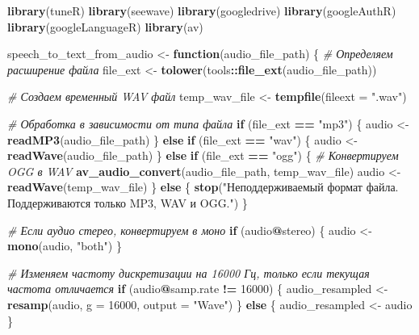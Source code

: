 \documentclass[
]{book}
\newenvironment{Shaded}{\begin{snugshade}}{\end{snugshade}}
\newcommand{\AttributeTok}[1]{\textcolor[rgb]{0.13,0.29,0.53}{#1}}
\newcommand{\CommentTok}[1]{\textcolor[rgb]{0.56,0.35,0.01}{\textit{#1}}}
\newcommand{\ControlFlowTok}[1]{\textcolor[rgb]{0.13,0.29,0.53}{\textbf{#1}}}
\newcommand{\DecValTok}[1]{\textcolor[rgb]{0.00,0.00,0.81}{#1}}
\newcommand{\FunctionTok}[1]{\textcolor[rgb]{0.13,0.29,0.53}{\textbf{#1}}}
\newcommand{\NormalTok}[1]{#1}
\newcommand{\OtherTok}[1]{\textcolor[rgb]{0.56,0.35,0.01}{#1}}
\newcommand{\SpecialCharTok}[1]{\textcolor[rgb]{0.81,0.36,0.00}{\textbf{#1}}}
\newcommand{\StringTok}[1]{\textcolor[rgb]{0.31,0.60,0.02}{#1}}
\begin{document}
\begin{Shaded}
\begin{Highlighting}[]
\FunctionTok{library}\NormalTok{(tuneR)}
\FunctionTok{library}\NormalTok{(seewave)}
\FunctionTok{library}\NormalTok{(googledrive)}
\FunctionTok{library}\NormalTok{(googleAuthR)}
\FunctionTok{library}\NormalTok{(googleLanguageR)}
\FunctionTok{library}\NormalTok{(av)}

\NormalTok{speech\_to\_text\_from\_audio }\OtherTok{\textless{}{-}} \ControlFlowTok{function}\NormalTok{(audio\_file\_path) \{}
  \CommentTok{\# Определяем расширение файла}
\NormalTok{  file\_ext }\OtherTok{\textless{}{-}} \FunctionTok{tolower}\NormalTok{(tools}\SpecialCharTok{::}\FunctionTok{file\_ext}\NormalTok{(audio\_file\_path))}
  
  \CommentTok{\# Создаем временный WAV файл}
\NormalTok{  temp\_wav\_file }\OtherTok{\textless{}{-}} \FunctionTok{tempfile}\NormalTok{(}\AttributeTok{fileext =} \StringTok{".wav"}\NormalTok{)}
  
  \CommentTok{\# Обработка в зависимости от типа файла}
  \ControlFlowTok{if}\NormalTok{ (file\_ext }\SpecialCharTok{==} \StringTok{"mp3"}\NormalTok{) \{}
\NormalTok{    audio }\OtherTok{\textless{}{-}} \FunctionTok{readMP3}\NormalTok{(audio\_file\_path)}
\NormalTok{  \} }\ControlFlowTok{else} \ControlFlowTok{if}\NormalTok{ (file\_ext }\SpecialCharTok{==} \StringTok{"wav"}\NormalTok{) \{}
\NormalTok{    audio }\OtherTok{\textless{}{-}} \FunctionTok{readWave}\NormalTok{(audio\_file\_path)}
\NormalTok{  \} }\ControlFlowTok{else} \ControlFlowTok{if}\NormalTok{ (file\_ext }\SpecialCharTok{==} \StringTok{"ogg"}\NormalTok{) \{}
    \CommentTok{\# Конвертируем OGG в WAV}
    \FunctionTok{av\_audio\_convert}\NormalTok{(audio\_file\_path, temp\_wav\_file)}
\NormalTok{    audio }\OtherTok{\textless{}{-}} \FunctionTok{readWave}\NormalTok{(temp\_wav\_file)}
\NormalTok{  \} }\ControlFlowTok{else}\NormalTok{ \{}
    \FunctionTok{stop}\NormalTok{(}\StringTok{"Неподдерживаемый формат файла. Поддерживаются только MP3, WAV и OGG."}\NormalTok{)}
\NormalTok{  \}}
  
  \CommentTok{\# Если аудио стерео, конвертируем в моно}
  \ControlFlowTok{if}\NormalTok{ (audio}\SpecialCharTok{@}\NormalTok{stereo) \{}
\NormalTok{    audio }\OtherTok{\textless{}{-}} \FunctionTok{mono}\NormalTok{(audio, }\StringTok{"both"}\NormalTok{)}
\NormalTok{  \}}
  
  \CommentTok{\# Изменяем частоту дискретизации на 16000 Гц, только если текущая частота отличается}
  \ControlFlowTok{if}\NormalTok{ (audio}\SpecialCharTok{@}\NormalTok{samp.rate }\SpecialCharTok{!=} \DecValTok{16000}\NormalTok{) \{}
\NormalTok{    audio\_resampled }\OtherTok{\textless{}{-}} \FunctionTok{resamp}\NormalTok{(audio, }\AttributeTok{g =} \DecValTok{16000}\NormalTok{, }\AttributeTok{output =} \StringTok{"Wave"}\NormalTok{)}
\NormalTok{  \} }\ControlFlowTok{else}\NormalTok{ \{}
\NormalTok{    audio\_resampled }\OtherTok{\textless{}{-}}\NormalTok{ audio}
\NormalTok{  \}}
  

\end{Highlighting}
\end{Shaded}
\end{document}
